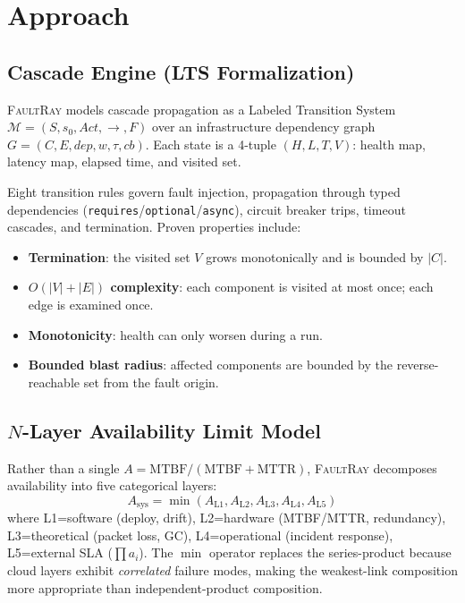 \documentclass[conference,10pt]{IEEEtran}
\begin{document}
\section{Approach}

\subsection{Cascade Engine (LTS Formalization)}

\textsc{FaultRay} models cascade propagation as a Labeled Transition
System $\mathcal{M} = (S, s_0, \mathit{Act}, {\longrightarrow}, F)$
over an infrastructure dependency graph $G = (C, E, \mathit{dep},
w, \tau, \mathit{cb})$. Each state is a 4-tuple $(H, L, T, V)$:
health map, latency map, elapsed time, and visited set.

Eight transition rules govern fault injection, propagation through
typed dependencies (\texttt{requires}/\texttt{optional}/\texttt{async}),
circuit breaker trips, timeout cascades, and termination. Proven
properties include:
\begin{itemize}[nosep,leftmargin=*]
  \item \textbf{Termination}: the visited set $V$ grows monotonically
    and is bounded by $|C|$.
  \item \textbf{$O(|V|{+}|E|)$ complexity}: each component is visited
    at most once; each edge is examined once.
  \item \textbf{Monotonicity}: health can only worsen during a run.
  \item \textbf{Bounded blast radius}: affected components are bounded
    by the reverse-reachable set from the fault origin.
\end{itemize}

\subsection{$N$-Layer Availability Limit Model}

Rather than a single $A = \text{MTBF}/(\text{MTBF}+\text{MTTR})$,
\textsc{FaultRay} decomposes availability into five categorical layers:
\begin{equation}
  A_{\text{sys}} = \min(A_{\text{L1}}, A_{\text{L2}}, A_{\text{L3}},
  A_{\text{L4}}, A_{\text{L5}})
\end{equation}
where L1=software (deploy, drift), L2=hardware (MTBF/MTTR, redundancy),
L3=theoretical (packet loss, GC), L4=operational (incident response),
L5=external SLA ($\prod a_i$). The $\min$ operator replaces the
series-product because cloud layers exhibit \emph{correlated} failure
modes, making the weakest-link composition more appropriate than
independent-product composition.
\end{document}
